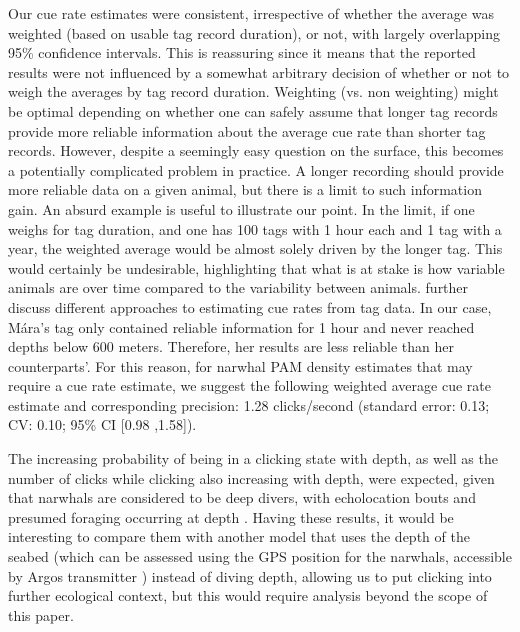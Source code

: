 \documentclass[preprint]{JASA}
\begin{document}
Our cue rate estimates were consistent, irrespective of whether the average was weighted (based on usable tag record duration), or not, with largely overlapping 95\% confidence intervals. This is reassuring since it means that the reported results were not influenced by a somewhat arbitrary decision of whether or not to weigh the averages by tag record duration. Weighting (vs. non weighting) might be optimal depending on whether one can safely assume that longer tag records provide more reliable information about the average cue rate than shorter tag records. However, despite a seemingly easy question on the surface, this becomes a potentially complicated problem in practice. A longer recording should provide more reliable data on a given animal, but there is a limit to such information gain. An absurd example is useful to illustrate our point. In the limit, if one weighs for tag duration, and one has 100 tags with 1 hour each and 1 tag with a year, the weighted average would be almost solely driven by the longer tag. This would certainly be undesirable, highlighting that what is at stake is how variable animals are over time compared to the variability between animals. \citet{Marques20233} further discuss different approaches to estimating cue rates from tag data. In our case, Mára's tag only contained reliable information for 1 hour and never reached depths below 600 meters. Therefore, her results are less reliable than her counterparts'. For this reason, for narwhal PAM density estimates that may require a cue rate estimate, we suggest  the following weighted average cue rate estimate and corresponding precision: 1.28 clicks/second (standard error: 0.13; CV: 0.10; 95\% CI [0.98 ,1.58]).

The increasing probability of being in a clicking state with depth, as well as the number of clicks while clicking also increasing with depth, were expected, given that narwhals are considered to be deep divers, with echolocation bouts and presumed foraging occurring at depth \citep{blackwell2018}. Having these results, it would be interesting to compare them with another model that uses the depth of the seabed (which can be assessed using the GPS position for the narwhals, accessible by Argos transmitter \citep{blackwell2018}) instead of diving depth, allowing us to put clicking into further ecological context, but this would require analysis beyond the scope of this paper.
\end{document}
